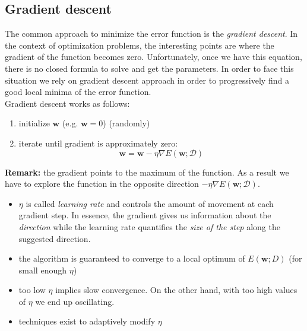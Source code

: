 \subsection{Gradient descent}
The common approach to minimize the error function is the \textit{gradient descent}. In the context of optimization problems, the interesting points are where the gradient of the function becomes zero. Unfortunately, once we have this equation, there is no closed formula to solve and get the parameters. In order to face this situation we rely on gradient descent approach in order to progressively find a good local minima of the error function.\\
Gradient descent works as follows:
\begin{enumerate}
    \item initialize $\pmb{w}$ (e.g. $\pmb{w}=0$) (randomly)
    
    \item iterate until gradient is approximately zero:
    \begin{equation}
        \label{eq:gradient_descent}
        \pmb{w} = \pmb{w} - \eta \nabla E(\pmb{w}; \mathcal{D})
    \end{equation}
\end{enumerate}

\textbf{Remark:} the gradient points to the maximum of the function. As a result we have to explore the function in the opposite direction $- \eta \nabla E(\pmb{w}; \mathcal{D})$.

\begin{itemize}
    \item $\eta$ is called \textit{learning rate} and controls the amount of movement at each gradient step. In essence, the gradient gives us information about the \textit{direction} while the learning rate quantifies the \textit{size of the step} along the suggested direction.
    
    \item the algorithm is guaranteed to converge to a local optimum of $E(\pmb{w}; \mathit{D})$ (for small enough $\eta$)
    
    \item too low $\eta$ implies slow convergence. On the other hand, with too high values of $\eta$ we end up oscillating.
    
    \item techniques exist to adaptively modify $\eta$
\end{itemize}

